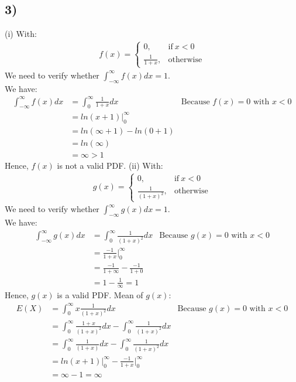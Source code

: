 \documentclass{article}
\begin{document}
\subsection*{3)}
(i) With:
\begin{align*}
f(x) =
\begin{cases}
      0, & \text{if}\ x<0 \\
      \frac{1}{1+x}, & \text{otherwise}
\end{cases}
\end{align*}
We need to verify whether $\int_{-\infty}^{\infty}f(x)dx = 1$.\\
We have: 
\begin{align*}
\int_{-\infty}^{\infty}f(x)dx &= \int_{0}^{\infty}\frac{1}{1+x}dx & \text{Because $f(x) = 0$ with $x < 0$}\\
&= ln(x+1) \Big|_{0}^{\infty}\\
&= ln(\infty + 1) - ln(0 + 1) \\ &= ln (\infty) \\& = \infty > 1
\end{align*}
Hence, $f(x)$ is not a valid PDF.
\newpage
(ii) With:
\begin{align*}
g(x) =
\begin{cases}
      0, & \text{if}\ x<0 \\
      \frac{1}{(1+x)^2}, & \text{otherwise}
\end{cases}
\end{align*}
We need to verify whether $\int_{-\infty}^{\infty}g(x)dx = 1$.\\
We have: 
\begin{align*}
\int_{-\infty}^{\infty}g(x)dx &= \int_{0}^{\infty}\frac{1}{(1+x)^2}dx & \text{Because $g(x) = 0$ with $x < 0$}\\
&= \frac{-1}{1 + x} \Big|_{0}^{\infty}\\
&= \frac{-1}{1 + \infty} - \frac{-1}{1 + 0} \\ 
&= 1 - \frac{1}{\infty} = 1
\end{align*}
Hence, $g(x)$ is a valid PDF.
Mean of $g(x)$:
\begin{align*}
E(X) &= \int_{0}^{\infty}x\frac{1}{(1+x)^2}dx & \text{Because $g(x) = 0$ with $x < 0$}\\
&= \int_{0}^{\infty}\frac{1 + x}{(1+x)^2}dx - \int_{0}^{\infty}\frac{1}{(1+x)^2}dx\\
&= \int_{0}^{\infty}\frac{1}{(1+x)}dx - \int_{0}^{\infty}\frac{1}{(1+x)^2}dx\\
&= ln(x+1) \Big|_{0}^{\infty} - \frac{-1}{1 + x} \Big|_{0}^{\infty}\\
&= \infty - 1 = \infty
\end{align*}
\end{document}

